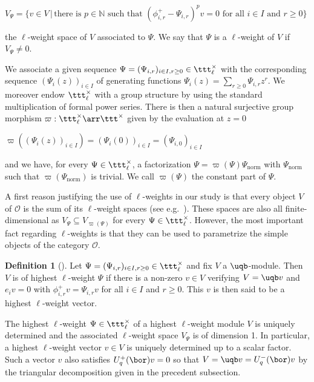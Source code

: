 \documentclass[11pt]{amsart}
\theoremstyle{definition}
\newtheorem{defn}[theorem]{Definition}
\theoremstyle{remark}
\numberwithin{equation}{section}
\begin{document}
\begin{center}
$V_{\Psi} = \{v\in V\,|\, \text{there is } p \in \mathbb{N} \text{ such that } (\phi_{i,r}^+-\Psi_{i,r})^pv = 0 \text{ for all } i\in I \text{ and } r \geq 0\}$
\end{center}
the $\ell$-weight space of $V$ associated to $\Psi$. We say that $\Psi$ is a $\ell$-weight of $V$ if $V_{\Psi} \neq 0$. \par
We associate a given sequence $\Psi = (\Psi_{i,r})_{i\in I,r\geq 0}\in \ttt_{\ell}^{\times}$ with the corresponding sequence $(\Psi_i(z))_{i\in I}$ of generating functions $\Psi_i(z) = \sum_{r\geq 0} \Psi_{i,r}z^r$. We moreover endow $\ttt^{\times}_{\ell}$ with a group structure by using the standard multiplication of formal power series. There is then a natural surjective group morphism $\varpi:\ttt^{\times}_{\ell}\arr \ttt^{\times}$ given by the evaluation at $z =0$
\begin{center}
$\varpi((\Psi_{i}(z))_{i\in I})=(\Psi_i(0))_{i\in I}= (\Psi_{i,0})_{i\in I}$
\end{center}
and we have, for every $\Psi \in \ttt^{\times}_{\ell}$, a factorization $\Psi = \varpi(\Psi)\Psi_{\text{norm}}$ with $\Psi_{\text{norm}}$ such that $\varpi(\Psi_{\text{norm}})$ is trivial. We call $\varpi(\Psi)$ the constant part of $\Psi$.  \par 
A first reason justifying the use of $\ell$-weights in our study is that every object $V$ of $\mathcal{O}$ is the sum of its $\ell$-weight spaces (see e.g.~\cite{her,fr}). These spaces are also all finite-dimensional as
$V_{\Psi}\subseteq V_{\varpi(\Psi)}$ for every $\Psi\in \ttt^{\times}_{\ell}$. However, the most important fact regarding $\ell$-weights is that they can be used to parametrize the simple objects of the category $\mathcal{O}$. 
\begin{defn}[{\cite[Definition 3.2]{hj}}] Let $\Psi = (\Psi_{i,r})_{i\in I,r\geq 0}\in \ttt^{\times}_{\ell}$ and fix $V$ a $\uqb$-module. Then $V$ is of highest $\ell$-weight $\Psi$ if there is a non-zero $v \in V$ verifying $V = \uqb v$ and $e_iv = 0$ with $\phi_{i,r}^+ v = \Psi_{i,r}v$ for all $i \in I$ and $r \geq 0$. This $v$ is then said to be a highest $\ell$-weight vector.
\end{defn}
The highest $\ell$-weight $\Psi\in \ttt^{\times}_{\ell}$ of a highest $\ell$-weight module $V$ is uniquely determined and the associated $\ell$-weight space $V_{\Psi}$ is of dimension 1. In particular, a highest $\ell$-weight vector $v\in V$ is uniquely determined up to a scalar factor. Such a vector $v$ also satisfies $U_q^+(\bor) v = 0$ so that $V = \uqb v = U_q^-(\bor)v$ by the triangular decomposition given in the precedent subsection.
\end{document}
